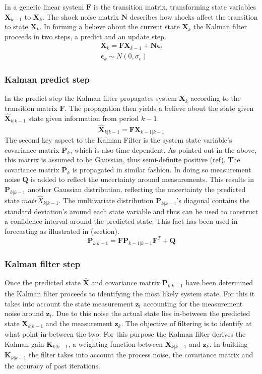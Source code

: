 \documentclass[12pt,a4paper,english]{article} %
\newcommand{\matr}[1]{\mathbf{#1}} %
\begin{document}
	In a generic linear system $\matr{F}$ is the transition matrix, transforming state variables $\matr{X}_{k-1}$ to $\matr{X}_k$. The shock noise matrix $\matr N$ describes how shocks affect the transition to state $\matr{X}_k$. In forming a believe about the current state $\matr{X}_k$ the Kalman filter proceeds in two steps, a predict and an update step.
	\begin{equation}
		\begin{aligned}
			\matr{X}_k = \matr F \matr{X}_{k-1} + \matr N \matr{\epsilon}_t \\
			\matr{\epsilon}_k \sim N(0, \sigma_{\epsilon})
		\end{aligned}
	\end{equation}
	
	\subsubsection{Kalman predict step}
	In the predict step the Kalman filter propagates system $\matr X_{k}$ according to the transition matrix $\matr F$. The propagation then yields a believe about the state given $\matr{\hat{X}}_{k|k-1}$ state given information from period $k-1$.
	\[
		\matr{\hat{X}}_{k|k-1} = \matr F \matr X_{k-1|k-1}
	\]
	The second key aspect to the Kalman Filter is the system state variable's covariance matrix $\matr P_{k}$, which is also time dependent. As pointed out in the above, this matrix is assumed to be Gaussian, thus semi-definite positive (ref). The covariance matrix $\matr P_{k}$ is propagated in similar fashion. In doing so measurement noise $\matr Q$ is added to reflect the uncertainty around measurements. This results in $\matr{P}_{k| k-1}$ another Gaussian distribution, reflecting the uncertainty the predicted state $matr{\hat{X}}_{k|k-1}$. The multivariate distribution $\matr{P}_{k| k-1}$'s diagonal contains the standard deviation's around each state variable and thus can be used to construct a confidence interval around the predicted state. This fact has been used in forecasting as illustrated in (section).
	\[
		\matr{P}_{k| k-1} = \matr F \matr{P}_{k-1| k-1} \matr{F}^T + \matr Q
	\]
	
	\subsubsection{Kalman filter step}
	Once the predicted state $\matr{\hat{X}}$ and covariance matrix $\matr{P}_{k| k-1}$ have been determined the Kalman filter proceeds to identifying the most likely system state. For this it takes into account the state measurement $\matr{z}_t$ accounting for the measurement noise around $\matr{z}_t$. 
	Due to this noise the actual state lies in-between the predicted state $\matr{X}_{k| k-1}$ and the measurement $\matr{z}_k$. The objective of filtering is to identify at what point in-between the two. For this purpose the Kalman filter derives the Kalman gain $\matr{K}_{k| k-1}$, a weighting function between $\matr{X}_{k| k-1}$ and $\matr{z}_k$. In building $\matr{K}_{k| k-1}$ the filter takes into account the process noise, the covariance matrix and the accuracy of past iterations.
	
\end{document}
